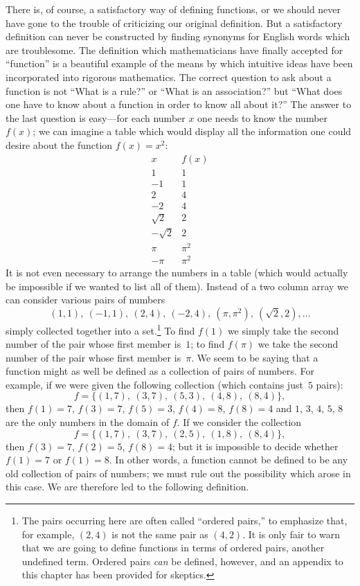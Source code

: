 There is, of course, a satisfactory way of defining functions, or we should
never have gone to the trouble of criticizing our original definition. But a
satisfactory definition can never be constructed by finding synonyms for
English words which are troublesome. The definition which mathematicians have
finally accepted for ``function'' is a beautiful example of the means by which
intuitive ideas have been incorporated into rigorous mathematics. The correct
question to ask about a function is not ``What is a rule?'' or ``What is an
association?'' but ``What does one have to know about a function in order to
know all about it?'' The answer to the last question is easy---for each number
$x$ one needs to know the number $f(x)$; we can imagine a table which would
display all the information one could desire about the function
$f(x) = x^2$:
\[
\begin{array}{cc}
x & f(x)\\
\hline
1 & 1\\
-1 & 1\\
2 & 4\\
-2 & 4\\
\sqrt{2} & 2\\
-\sqrt{2} & 2\\
\pi & \pi^2\\
-\pi & \pi^2
\end{array}
\]
It is not even necessary to arrange the numbers in a table (which would
actually be impossible if we wanted to list all of them). Instead of a two
column array we can consider various pairs of numbers
\[
(1,1),\ (-1,1),\ (2,4),\ (-2,4),\ (\pi,\pi^2),\ (\sqrt{2},2),\dots
\]
simply collected together into a set.\footnote{The pairs occurring here are
often called ``ordered pairs,'' to emphasize that, for example, $(2,4)$ is not
the same pair as $(4,2)$. It is only fair to warn that we are going to define
functions in terms of ordered pairs, another undefined term. Ordered pairs
\emph{can} be defined, however, and an appendix to this chapter has been
provided for skeptics.} To find $f(1)$ we simply take the second number of
the pair whose first member is~$1$; to find $f(\pi)$ we take the second number
of the pair whose first member is~$\pi$. We seem to be saying that a function
might as well be defined as a collection of pairs of numbers. For example, if
we were given the following collection (which contains just~$5$ pairs):
\[
f = \bigl\{(1,7),\ (3,7),\ (5,3),\ (4,8),\ (8,4)\bigr\},
\]
then $f(1)=7$, $f(3)=7$, $f(5)=3$, $f(4)=8$, $f(8)=4$ and $1$, $3$, $4$, $5$,
$8$ are the only numbers in the domain of $f$. If we consider the collection
\[
f = \bigl\{(1,7),\ (3,7),\ (2,5),\ (1,8),\ (8,4)\bigr\},
\]
then $f(3)=7$, $f(2)=5$, $f(8)=4$; but it is impossible to decide whether
$f(1)=7$ or $f(1)=8$. In other words, a function cannot be defined to be any
old collection of pairs of numbers; we must rule out the possibility which
arose in this case. We are therefore led to the following definition.

